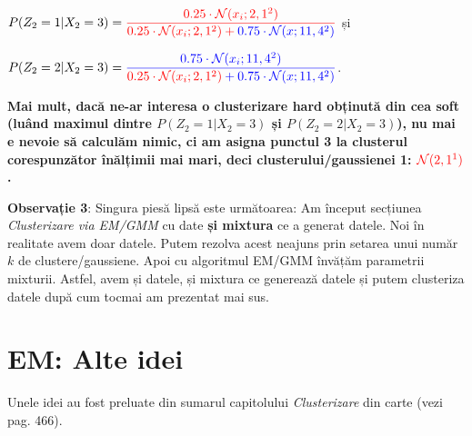 \documentclass[12pt]{article}
\begin{document}
	$P(Z_2 = 1|X_2= 3) = {\color{red}\dfrac{0.25\cdot \mathcal{N}(x_i;2,1^2)}{0.25\cdot \mathcal{N}(x_i;2,1^2) + {\color{blue}0.75\cdot\mathcal{N}(x;11,4^2)}}}$ și
	
	 $P(Z_2 = 2|X_2= 3) = {\color{blue}\dfrac{0.75\cdot \mathcal{N}(x_i;11,4^2)}{{\color{red}0.25\cdot \mathcal{N}(x_i;2,1^2)} + 0.75\cdot\mathcal{N}(x;11,4^2)}}$. 
	 
	 \textbf{Mai mult, dacă ne-ar interesa o clusterizare \textbf{hard} obținută din cea soft (luând maximul dintre $P(Z_2 = 1|X_2=3)$ și $P(Z_2 = 2|X_2=3)$), nu mai e nevoie să calculăm nimic, ci am asigna punctul 3 la clusterul corespunzător înălțimii mai mari, deci clusterului/gaussienei 1: $\color{red}\mathcal{N}(2,1^1)$.}
	
		\textbf{Observație 3}: Singura piesă lipsă este următoarea: Am început secțiunea \textit{Clusterizare via EM/GMM} cu date \textbf{și mixtura} ce a generat datele. Noi în realitate avem doar datele. Putem rezolva acest neajuns prin setarea unui număr $k$ de clustere/gaussiene. Apoi cu algoritmul EM/GMM învățăm parametrii mixturii. Astfel, avem și datele, și mixtura ce generează datele și putem clusteriza datele după cum tocmai am prezentat mai sus.
	\newpage
	\section{EM: Alte idei}
	
	Unele idei au fost preluate din sumarul capitolului \textit{Clusterizare} din carte (vezi pag. 466).
	
\end{document}
